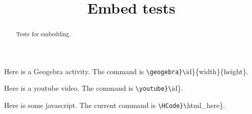 \documentclass{ximera}
\title{Embed tests}
\begin{document}
	
\begin{abstract}
Tests for embedding.
\end{abstract}

\maketitle

Here is a Geogebra activity. The command is \verb{\geogebra}\{id\}\{width\}\{height\}.


Here is a youtube video. The command is \verb{\youtube}\{id\}.


Here is some javascript. The current command is \verb{\HCode}\{html\_here\}.

\end{document}
